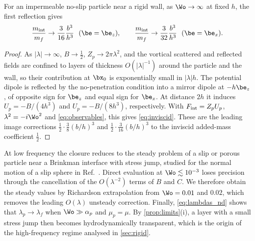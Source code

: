 \begin{proposition}\label{prop:inviscid}
For an impermeable no-slip particle near a rigid wall, as $\Wo\to\infty$ at fixed $h$, the first reflection gives
\begin{equation}
  \frac{m_{\rm int}}{m_f}\to\frac{3}{16}\frac{b^3}{h^3}\ \ (\be=\be_z),\qquad
  \frac{m_{\rm int}}{m_f}\to\frac{3}{32}\frac{b^3}{h^3}\ \ (\be=\be_x).
  \label{eq:inviscid}
\end{equation}
\end{proposition}
\begin{proof}
As $|\lambda|\to\infty$, $B\to\tfrac12$, $Z_p\to2\pi\lambda^2$, and the vortical scattered and reflected fields are
confined to layers of thickness $O(|\lambda|^{-1})$ around the particle and the wall, so their contribution at
$\bx_0$ is exponentially small in $|\lambda|h$. The potential dipole is reflected by the no-penetration condition into a
mirror dipole at $-h\be_z$, of opposite sign for $\be_z$ and equal sign for $\be_x$. At distance $2h$ it induces
$U_p=-B/(4h^3)$ and $U_p=-B/(8h^3)$, respectively. With $F_{\rm int}=Z_pU_p$, $\lambda^2=-i\Wo^2$ and
\cref{eq:observables}, this gives \cref{eq:inviscid}. These are the leading image corrections
$\tfrac12\cdot\tfrac38(b/h)^3$ and $\tfrac12\cdot\tfrac3{16}(b/h)^3$ to the inviscid added-mass coefficient
$\tfrac12$.
\end{proof}

At low frequency the closure reduces to the steady problem of a slip or porous particle near a Brinkman interface with
stress jump, studied for the normal motion of a slip sphere in Ref.~. Direct
evaluation at $\Wo\lesssim10^{-3}$ loses precision through the cancellation of the $O(\lambda^{-2})$ terms of $B$ and $C$.
We therefore obtain the steady values by Richardson extrapolation from $\Wo=0.01$ and $0.02$, which removes the leading
$O(\lambda)$ unsteady correction. Finally, \cref{eq:lambdas_nd} shows that $\lambda_p\to\lambda_f$ when $\Wo\gg\alpha_p$
and $\mu_p=\mu$. By \cref{prop:limits}(i), a layer with a small stress jump then becomes hydrodynamically transparent,
which is the origin of the high-frequency regime analysed in \cref{sec:rigid}.
